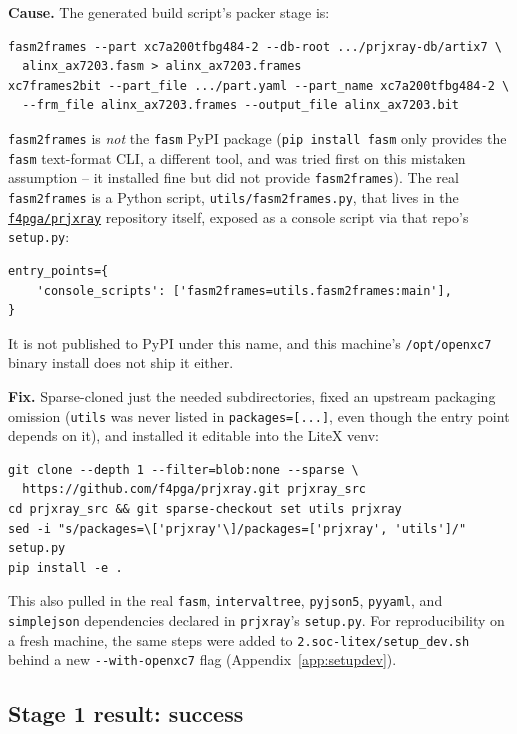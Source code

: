 \documentclass[11pt]{article}
\begin{document}
\textbf{Cause.} The generated build script's packer stage is:
\begin{lstlisting}[style=termout]
fasm2frames --part xc7a200tfbg484-2 --db-root .../prjxray-db/artix7 \
  alinx_ax7203.fasm > alinx_ax7203.frames
xc7frames2bit --part_file .../part.yaml --part_name xc7a200tfbg484-2 \
  --frm_file alinx_ax7203.frames --output_file alinx_ax7203.bit
\end{lstlisting}
\lstinline{fasm2frames} is \emph{not} the \lstinline{fasm} PyPI package
(\lstinline{pip install fasm} only provides the \lstinline{fasm} text-format
CLI, a different tool, and was tried first on this mistaken assumption --
it installed fine but did not provide \lstinline{fasm2frames}). The real
\lstinline{fasm2frames} is a Python script,
\lstinline{utils/fasm2frames.py}, that lives in the
\href{https://github.com/f4pga/prjxray}{\texttt{f4pga/prjxray}}
repository itself, exposed as a console script via that repo's
\lstinline{setup.py}:
\begin{lstlisting}[style=codeblk]
entry_points={
    'console_scripts': ['fasm2frames=utils.fasm2frames:main'],
}
\end{lstlisting}
It is not published to PyPI under this name, and this machine's
\lstinline{/opt/openxc7} binary install does not ship it either.

\textbf{Fix.} Sparse-cloned just the needed subdirectories, fixed an
upstream packaging omission (\lstinline{utils} was never listed in
\lstinline{packages=[...]}, even though the entry point depends on it),
and installed it editable into the LiteX venv:
\begin{lstlisting}[style=termout]
git clone --depth 1 --filter=blob:none --sparse \
  https://github.com/f4pga/prjxray.git prjxray_src
cd prjxray_src && git sparse-checkout set utils prjxray
sed -i "s/packages=\['prjxray'\]/packages=['prjxray', 'utils']/" setup.py
pip install -e .
\end{lstlisting}
This also pulled in the real \lstinline{fasm}, \lstinline{intervaltree},
\lstinline{pyjson5}, \lstinline{pyyaml}, and \lstinline{simplejson}
dependencies declared in \lstinline{prjxray}'s \lstinline{setup.py}.
For reproducibility on a fresh machine, the same steps were added to
\lstinline{2.soc-litex/setup_dev.sh} behind a new \lstinline{--with-openxc7}
flag (Appendix~\ref{app:setupdev}).

\subsection{Stage 1 result: success}
\end{document}
